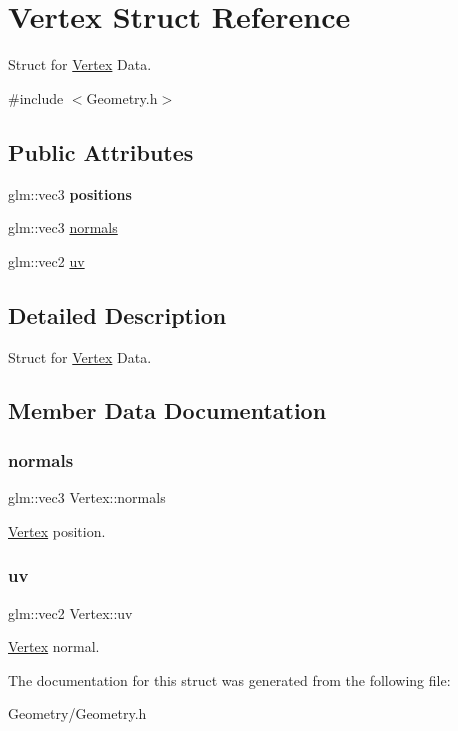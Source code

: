 \hypertarget{struct_vertex}{}\section{Vertex Struct Reference}
\label{struct_vertex}


Struct for \mbox{\hyperlink{struct_vertex}{Vertex}} Data.  




{\ttfamily \#include $<$Geometry.\+h$>$}

\subsection*{Public Attributes}
\begin{DoxyCompactItemize}
\item 
\mbox{\label{struct_vertex_a8e2d92d6de3fe1d812e0b0b01615a2c7}} 
glm\+::vec3 {\bfseries positions}
\item 
glm\+::vec3 \mbox{\hyperlink{struct_vertex_a95a2372322d18dab29cfe967caa87761}{normals}}
\item 
glm\+::vec2 \mbox{\hyperlink{struct_vertex_a8d5cc8548016889746f251d98377ec8a}{uv}}
\end{DoxyCompactItemize}


\subsection{Detailed Description}
Struct for \mbox{\hyperlink{struct_vertex}{Vertex}} Data. 



\subsection{Member Data Documentation}
\mbox{\label{struct_vertex_a95a2372322d18dab29cfe967caa87761}} 
\subsubsection{\texorpdfstring{normals}{normals}}
{\footnotesize\ttfamily glm\+::vec3 Vertex\+::normals}

\mbox{\hyperlink{struct_vertex}{Vertex}} position. \mbox{\label{struct_vertex_a8d5cc8548016889746f251d98377ec8a}} 
\subsubsection{\texorpdfstring{uv}{uv}}
{\footnotesize\ttfamily glm\+::vec2 Vertex\+::uv}

\mbox{\hyperlink{struct_vertex}{Vertex}} normal. 

The documentation for this struct was generated from the following file\+:\begin{DoxyCompactItemize}
\item 
Geometry/Geometry.\+h\end{DoxyCompactItemize}
